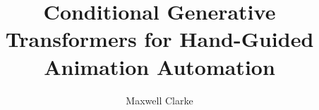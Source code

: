 \documentclass[12pt, a4paper, twoside, openright]{book}
\begin{document}
\frontmatter


\title{Conditional Generative Transformers for Hand-Guided Animation Automation}
\author{Maxwell Clarke}

\subject{Computer Science}


\mscbothparts







\maketitle



\tableofcontents

\listoffigures
\newpage
\listoftables


\mainmatter

















%
\printbibliography
\end{document}
